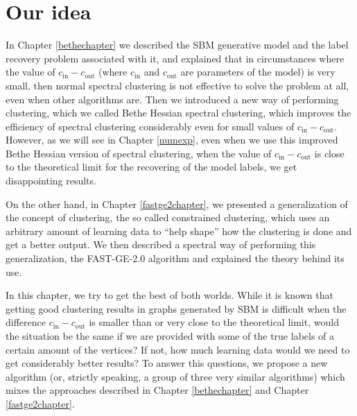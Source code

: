 \section{Our idea}
In Chapter \ref{bethechapter} we described the SBM generative model and the label recovery problem associated with it, and explained that in circumstances where the value of $c_\text{in} - c_\text{out}$ (where $c_\text{in}$ and $c_\text{out}$ are parameters of the model) is very small, then normal spectral clustering is not effective to solve the problem at all, even when other algorithms are.
Then we introduced a new way of performing clustering, which we called Bethe Hessian spectral clustering, which improves the efficiency of spectral clustering considerably even for small values of $c_\text{in} - c_\text{out}$.
However, as we will see in Chapter \ref{numexp}, even when we use this improved Bethe Hessian version of spectral clustering, when the value of $c_\text{in} - c_\text{out}$ is close to the theoretical limit for the recovering of the model labels, we get disappointing results.

On the other hand, in Chapter \ref{fastge2chapter}, we presented a generalization of the concept of clustering, the so called constrained clustering, which uses an arbitrary amount of learning data to ``help shape'' how the clustering is done and get a better output.
We then described a spectral way of performing this generalization, the FAST-GE-2.0 algorithm and explained the theory behind its use.

In this chapter, we try to get the best of both worlds. 
While it is known that getting good clustering results in graphs generated by SBM is difficult when the difference $c_\text{in} - c_\text{out}$ is smaller than or very close to the theoretical limit, would the situation be the same if we are provided with some of the true labels of a certain amount of the vertices? If not, how much learning data would we need to get considerably better results?
To answer this questions, we propose a new algorithm (or, strictly speaking, a group of three very similar algorithms) which mixes the approaches described in Chapter \ref{bethechapter} and Chapter \ref{fastge2chapter}.

